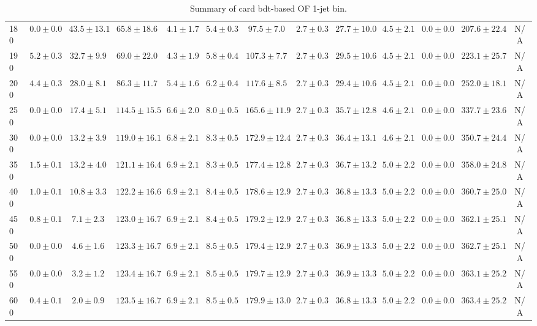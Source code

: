 \begin{table}
{\begin{center}
\begin{tabular}{l | c c | c c c c c c c c  | c c}
180 & $0.0\pm0.0$ & $43.5\pm13.1$ & $65.8\pm18.6$ & $4.1\pm1.7$ & $5.4\pm0.3$ & $97.5\pm7.0$ & $2.7\pm0.3$ & $27.7\pm10.0$ & $4.5\pm2.1$ & $0.0\pm0.0$ & $207.6\pm22.4$ & N/A \\
190 & $5.2\pm0.3$ & $32.7\pm9.9$ & $69.0\pm22.0$ & $4.3\pm1.9$ & $5.8\pm0.4$ & $107.3\pm7.7$ & $2.7\pm0.3$ & $29.5\pm10.6$ & $4.5\pm2.1$ & $0.0\pm0.0$ & $223.1\pm25.7$ & N/A \\
200 & $4.4\pm0.3$ & $28.0\pm8.1$ & $86.3\pm11.7$ & $5.4\pm1.6$ & $6.2\pm0.4$ & $117.6\pm8.5$ & $2.7\pm0.3$ & $29.4\pm10.6$ & $4.5\pm2.1$ & $0.0\pm0.0$ & $252.0\pm18.1$ & N/A \\
250 & $0.0\pm0.0$ & $17.4\pm5.1$ & $114.5\pm15.5$ & $6.6\pm2.0$ & $8.0\pm0.5$ & $165.6\pm11.9$ & $2.7\pm0.3$ & $35.7\pm12.8$ & $4.6\pm2.1$ & $0.0\pm0.0$ & $337.7\pm23.6$ & N/A \\
300 & $0.0\pm0.0$ & $13.2\pm3.9$ & $119.0\pm16.1$ & $6.8\pm2.1$ & $8.3\pm0.5$ & $172.9\pm12.4$ & $2.7\pm0.3$ & $36.4\pm13.1$ & $4.6\pm2.1$ & $0.0\pm0.0$ & $350.7\pm24.4$ & N/A \\
350 & $1.5\pm0.1$ & $13.2\pm4.0$ & $121.1\pm16.4$ & $6.9\pm2.1$ & $8.3\pm0.5$ & $177.4\pm12.8$ & $2.7\pm0.3$ & $36.7\pm13.2$ & $5.0\pm2.2$ & $0.0\pm0.0$ & $358.0\pm24.8$ & N/A \\
400 & $1.0\pm0.1$ & $10.8\pm3.3$ & $122.2\pm16.6$ & $6.9\pm2.1$ & $8.4\pm0.5$ & $178.6\pm12.9$ & $2.7\pm0.3$ & $36.8\pm13.3$ & $5.0\pm2.2$ & $0.0\pm0.0$ & $360.7\pm25.0$ & N/A \\
450 & $0.8\pm0.1$ & $7.1\pm2.3$ & $123.0\pm16.7$ & $6.9\pm2.1$ & $8.4\pm0.5$ & $179.2\pm12.9$ & $2.7\pm0.3$ & $36.8\pm13.3$ & $5.0\pm2.2$ & $0.0\pm0.0$ & $362.1\pm25.1$ & N/A \\
500 & $0.0\pm0.0$ & $4.6\pm1.6$ & $123.3\pm16.7$ & $6.9\pm2.1$ & $8.5\pm0.5$ & $179.4\pm12.9$ & $2.7\pm0.3$ & $36.9\pm13.3$ & $5.0\pm2.2$ & $0.0\pm0.0$ & $362.7\pm25.1$ & N/A \\
550 & $0.0\pm0.0$ & $3.2\pm1.2$ & $123.4\pm16.7$ & $6.9\pm2.1$ & $8.5\pm0.5$ & $179.7\pm12.9$ & $2.7\pm0.3$ & $36.9\pm13.3$ & $5.0\pm2.2$ & $0.0\pm0.0$ & $363.1\pm25.2$ & N/A \\
600 & $0.4\pm0.1$ & $2.0\pm0.9$ & $123.5\pm16.7$ & $6.9\pm2.1$ & $8.5\pm0.5$ & $179.9\pm13.0$ & $2.7\pm0.3$ & $36.8\pm13.3$ & $5.0\pm2.2$ & $0.0\pm0.0$ & $363.4\pm25.2$ & N/A \\
\hline
\end{tabular}
\end{center}
}
\caption{Summary of card bdt-based OF 1-jet bin.}
\end{table}
